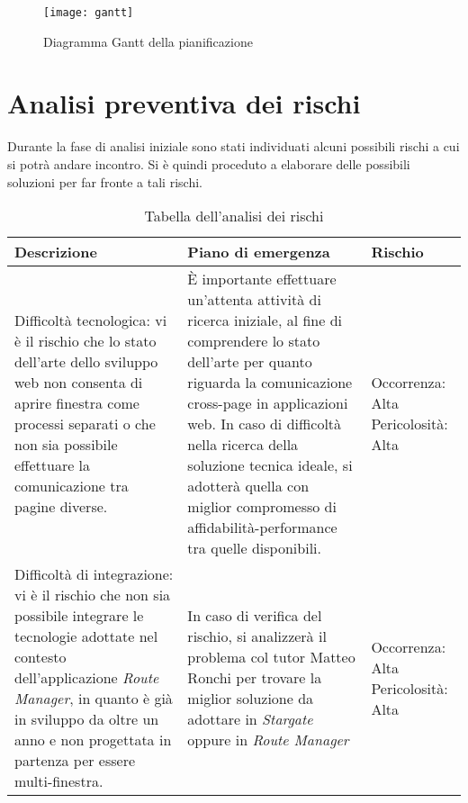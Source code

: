 \begin{figure}[H] 
    \centering 
    \texttt{[image: gantt]} 
    \caption{Diagramma Gantt della pianificazione}
\end{figure}

\section{Analisi preventiva dei rischi}

Durante la fase di analisi iniziale sono stati individuati alcuni possibili rischi a cui si potrà andare incontro.
Si è quindi proceduto a elaborare delle possibili soluzioni per far fronte a tali rischi.\\

\begin{table}[H]
\small
\begin{tabular}{ |p{4.5cm} |p{4.5cm} |p{3cm}|}
\hline
\textbf{Descrizione} & \textbf{Piano di emergenza} & \textbf{Rischio} \\ \hline
Difficoltà tecnologica: vi è il rischio che lo stato dell'arte dello sviluppo web non consenta di aprire finestra come processi separati o che non sia possibile effettuare la comunicazione tra pagine diverse. & È importante effettuare un'attenta attività di ricerca iniziale, al fine di comprendere lo stato dell'arte per quanto riguarda la comunicazione cross-page in applicazioni web. \newline In caso di difficoltà nella ricerca della soluzione tecnica ideale, si adotterà quella con miglior compromesso di affidabilità-performance tra quelle disponibili. & Occorrenza: Alta \newline Pericolosità: Alta \\ \hline

Difficoltà di integrazione: vi è il rischio che non sia possibile integrare le tecnologie adottate nel contesto dell'applicazione \textit{Route Manager}, in quanto è già in sviluppo da oltre un anno e non progettata in partenza per essere multi-finestra. & In caso di verifica del rischio, si analizzerà il problema col tutor Matteo Ronchi per trovare la miglior soluzione da adottare in \textit{Stargate} oppure in \textit{Route Manager} & Occorrenza: Alta \newline Pericolosità: Alta \\ \hline
\end{tabular}
\caption{Tabella dell'analisi dei rischi}
\end{table}

